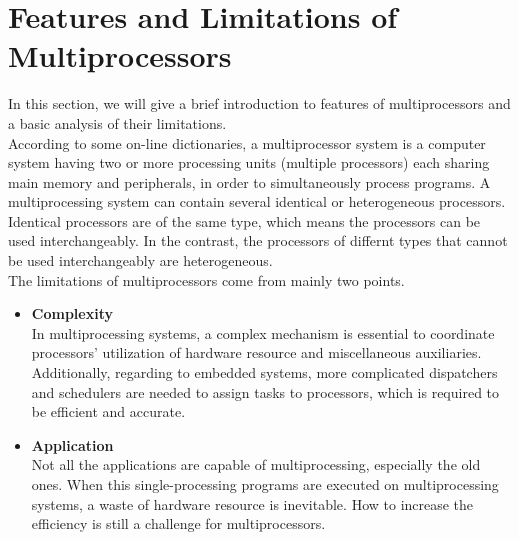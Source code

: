 \documentclass[conference]{IEEEtran}
\begin{document}
\section{Features and Limitations of Multiprocessors}
In this section, we will give a brief introduction to features of multiprocessors and a basic analysis of their limitations.\\
According to some on-line dictionaries, a multiprocessor system is a computer system having two or more processing units (multiple processors) each sharing main memory and peripherals, in order to simultaneously process programs\cite{defmultiprocessor}. A multiprocessing system can contain several identical or heterogeneous processors. Identical processors are of the same type, which means the processors can be used interchangeably. In the contrast, the processors of differnt types that cannot be used interchangeably are heterogeneous\cite{liu2000real}.\\
\indent
The limitations of multiprocessors come from mainly two points.
\begin{itemize}
	\item{\textbf{Complexity}}\\
	\indent
	In multiprocessing systems, a complex mechanism is essential to coordinate processors' utilization of hardware resource and miscellaneous auxiliaries. Additionally, regarding to embedded systems, more complicated dispatchers and schedulers are needed to assign tasks to processors, which is required to be efficient and accurate.
	\item{\textbf{Application}}\\
	\indent
	Not all the applications are capable of multiprocessing, especially the old ones. When this single-processing programs are executed on multiprocessing systems, a waste of hardware resource is inevitable. How to increase the efficiency is still a challenge for multiprocessors.
\end{itemize}  
\end{document}
